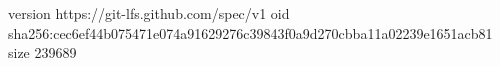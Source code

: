 version https://git-lfs.github.com/spec/v1
oid sha256:cec6ef44b075471e074a91629276c39843f0a9d270cbba11a02239e1651acb81
size 239689
